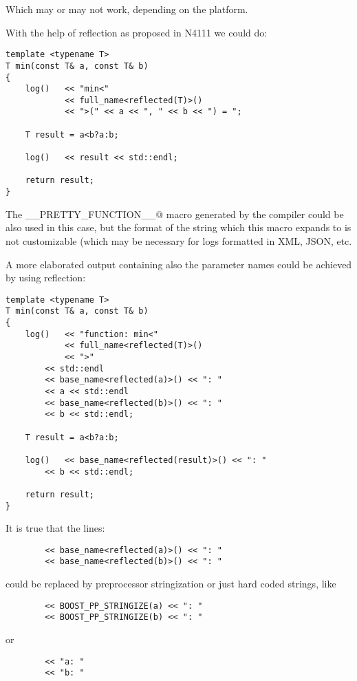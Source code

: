 Which may or may not work, depending on the platform.

With the help of reflection as proposed in N4111 we could do:

\begin{verbatim}
template <typename T>
T min(const T& a, const T& b)
{
	log()   << "min<"
	        << full_name<reflected(T)>()
	        << ">(" << a << ", " << b << ") = ";

	T result = a<b?a:b;

	log()   << result << std::endl;

	return result;
}
\end{verbatim}

The \verb@__PRETTY_FUNCTION__@ macro generated by the compiler could be also
used in this case, but the format of the string which this macro expands to is not customizable
(which may be necessary for logs formatted in XML, JSON, etc.

A more elaborated output containing also the parameter names could be achieved
by using reflection:

\begin{verbatim}
template <typename T>
T min(const T& a, const T& b)
{
	log()   << "function: min<"
	        << full_name<reflected(T)>()
	        << ">"
		<< std::endl
		<< base_name<reflected(a)>() << ": "
		<< a << std::endl
		<< base_name<reflected(b)>() << ": "
		<< b << std::endl;

	T result = a<b?a:b;

	log()   << base_name<reflected(result)>() << ": "
		<< b << std::endl;

	return result;
}
\end{verbatim}

It is true that the lines:
\begin{verbatim}
		<< base_name<reflected(a)>() << ": "
		<< base_name<reflected(b)>() << ": "
\end{verbatim}

could be replaced by preprocessor stringization or just hard coded
strings, like

\begin{verbatim}
		<< BOOST_PP_STRINGIZE(a) << ": "
		<< BOOST_PP_STRINGIZE(b) << ": "
\end{verbatim}

or

\begin{verbatim}
		<< "a: "
		<< "b: "
\end{verbatim}

